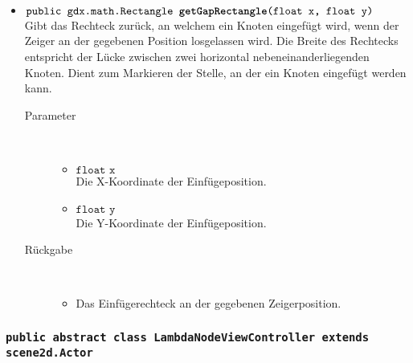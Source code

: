 \begin{description}
\begin{itemize}
		\item $\texttt{public gdx.math.Rectangle \textbf{getGapRectangle}(float x, float y)}$ \\ Gibt das Rechteck zurück, an welchem ein Knoten eingefügt wird, wenn der Zeiger an der gegebenen Position losgelassen wird. Die Breite des Rechtecks entspricht der Lücke zwischen zwei horizontal nebeneinanderliegenden Knoten. Dient zum Markieren der Stelle, an der ein Knoten eingefügt werden kann.
		\begin{description}
			\item[Parameter] \hfill \\
			\vspace{-.8cm}
			\begin{itemize}
				\item $\texttt{float x}$ \\ Die X-Koordinate der Einfügeposition.
				\item $\texttt{float y}$ \\ Die Y-Koordinate der Einfügeposition.
			\end{itemize}
			\item[Rückgabe] \hfill \\
			\vspace{-.8cm}
			\begin{itemize}
				\item Das Einfügerechteck an der gegebenen Zeigerposition.
			\end{itemize}
		\end{description}
	\end{itemize}
\end{description}

\subsubsection{\normalfont \texttt{public abstract class \textbf{LambdaNodeViewController} extends scene2d.Actor}}

